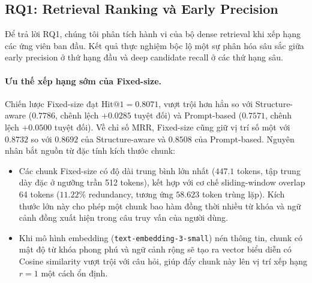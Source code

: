 \subsection{RQ1: Retrieval Ranking và Early Precision}
\label{subsec:rq1_ranking}

Để trả lời RQ1, chúng tôi phân tích hành vi của bộ dense retrieval khi xếp hạng các ứng viên ban đầu. Kết quả thực nghiệm bộc lộ một sự phân hóa sâu sắc giữa early precision ở thứ hạng đầu và deep candidate recall ở các thứ hạng sâu.

\paragraph{Ưu thế xếp hạng sớm của Fixed-size.}
Chiến lược Fixed-size đạt $\text{Hit@1} = 0.8071$, vượt trội hơn hẳn so với Structure-aware ($0.7786$, chênh lệch $+0.0285$ tuyệt đối) và Prompt-based ($0.7571$, chênh lệch $+0.0500$ tuyệt đối). Về chỉ số MRR, Fixed-size cũng giữ vị trí số một với $0.8732$ so với $0.8692$ của Structure-aware và $0.8508$ của Prompt-based. Nguyên nhân bắt nguồn từ đặc tính kích thước chunk:
\begin{itemize}
    \item Các chunk Fixed-size có độ dài trung bình lớn nhất ($447.1$ tokens, tập trung dày đặc ở ngưỡng trần 512 tokens), kết hợp với cơ chế sliding-window overlap 64 tokens ($11.22\%$ redundancy, tương ứng $58.623$ token trùng lặp). Kích thước lớn này cho phép một chunk bao hàm đồng thời nhiều từ khóa và ngữ cảnh đồng xuất hiện trong câu truy vấn của người dùng.
    \item Khi mô hình embedding (\texttt{text-embedding-3-small}) nén thông tin, chunk có mật độ từ khóa phong phú và ngữ cảnh rộng sẽ tạo ra vector biểu diễn có Cosine similarity vượt trội với câu hỏi, giúp đẩy chunk này lên vị trí xếp hạng $r=1$ một cách ổn định.
\end{itemize}

